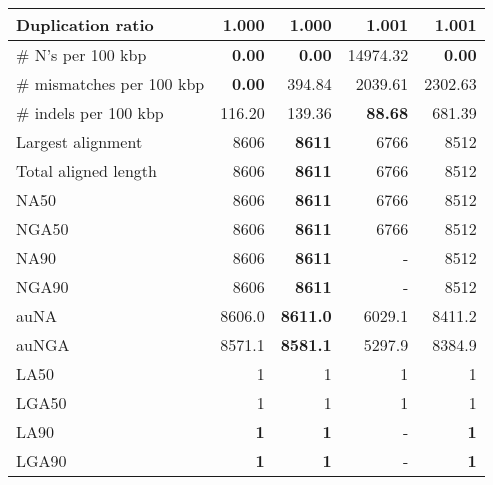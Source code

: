 \documentclass[12pt,a4paper]{article}
\begin{document}
\begin{table}[ht]
\begin{center}
\begin{tabular}{|l*{4}{|r}|}
Duplication ratio & {\bf 1.000} & {\bf 1.000} & 1.001 & 1.001 \\ \hline
\# N's per 100 kbp & {\bf 0.00} & {\bf 0.00} & 14974.32 & {\bf 0.00} \\ \hline
\# mismatches per 100 kbp & {\bf 0.00} & 394.84 & 2039.61 & 2302.63 \\ \hline
\# indels per 100 kbp & 116.20 & 139.36 & {\bf 88.68} & 681.39 \\ \hline
Largest alignment & 8606 & {\bf 8611} & 6766 & 8512 \\ \hline
Total aligned length & 8606 & {\bf 8611} & 6766 & 8512 \\ \hline
NA50 & 8606 & {\bf 8611} & 6766 & 8512 \\ \hline
NGA50 & 8606 & {\bf 8611} & 6766 & 8512 \\ \hline
NA90 & 8606 & {\bf 8611} & - & 8512 \\ \hline
NGA90 & 8606 & {\bf 8611} & - & 8512 \\ \hline
auNA & 8606.0 & {\bf 8611.0} & 6029.1 & 8411.2 \\ \hline
auNGA & 8571.1 & {\bf 8581.1} & 5297.9 & 8384.9 \\ \hline
LA50 & 1 & 1 & 1 & 1 \\ \hline
LGA50 & 1 & 1 & 1 & 1 \\ \hline
LA90 & {\bf 1} & {\bf 1} & - & {\bf 1} \\ \hline
LGA90 & {\bf 1} & {\bf 1} & - & {\bf 1} \\ \hline
\end{tabular}
\end{center}
\end{table}
\end{document}

